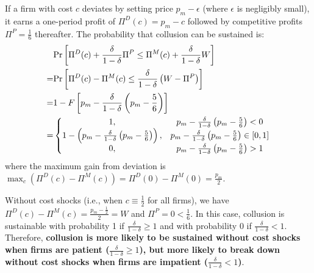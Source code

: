 \documentclass[12pt]{article}
\begin{document}
If a firm with cost $c$ deviates by setting price $p_m-\epsilon$ (where $\epsilon$ is negligibly small), it earns a one-period profit of $\Pi^D(c)=p_m-c$ followed by competitive profits $\Pi^P=\frac{1}{6}$ thereafter. The probability that collusion can be sustained is:
\begin{equation}
    \begin{aligned}
        &\textnormal{Pr}\left[\Pi^D(c)+\frac{\delta}{1-\delta}\Pi^P\leq \Pi^M(c)+\frac{\delta}{1-\delta}W\right]\\
        =&\textnormal{Pr}\left[\Pi^D(c)-\Pi^M(c)\leq \frac{\delta}{1-\delta}\left(W-\Pi^P\right)\right]\\
        =&1-F\left[p_m-\frac{\delta}{1-\delta}\left(p_m-\frac{5}{6}\right)\right]\\
        =&\left\{\begin{matrix}
            1,&p_m-\frac{\delta}{1-\delta}\left(p_m-\frac{5}{6}\right)<0\\
            1-\left(p_m-\frac{\delta}{1-\delta}\left(p_m-\frac{5}{6}\right)\right),&p_m-\frac{\delta}{1-\delta}\left(p_m-\frac{5}{6}\right)\in[0,1]\\
            0,&p_m-\frac{\delta}{1-\delta}\left(p_m-\frac{5}{6}\right)>1
        \end{matrix}\right.
        \end{aligned}
        \label{eq_p}
\end{equation}
where the maximum gain from deviation is $\max_c\left(\Pi^D(c)-\Pi^M(c)\right)=\Pi^D(0)-\Pi^M(0)=\frac{p_m}{2}$.

Without cost shocks (i.e., when $c\equiv \frac{1}{2}$ for all firms), we have $\Pi^D(c)-\Pi^M(c)=\frac{p_m-\frac{1}{2}}{2}=W$ and $\Pi^P=0<\frac{1}{6}$. In this case, collusion is sustainable with probability 1 if $\frac{\delta}{1-\delta}\geq 1$ and with probability 0 if $\frac{\delta}{1-\delta}<1$. Therefore, \textbf{collusion is more likely to be sustained without cost shocks when firms are patient ($\frac{\delta}{1-\delta}\geq 1$), but more likely to break down without cost shocks when firms are impatient ($\frac{\delta}{1-\delta}< 1$)}.
\end{document}

